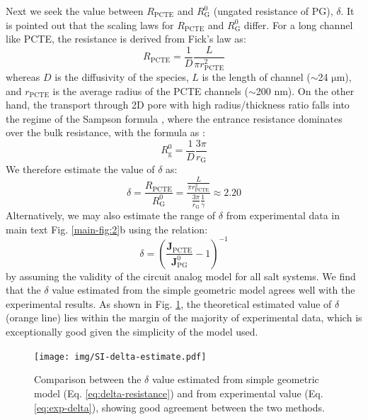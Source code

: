 \documentclass[manuscript=suppinfo,email=true, hyperref=true, keywords=false]{achemso}
\newcommand{\Fig}{Fig.}
\begin{document}
Next we seek the value between $R_{\mathrm{PCTE}}$ and
$R_{\mathrm{G}}^{0}$ (ungated resistance of PG), $\delta$. It is
pointed out that the scaling laws for $R_{\mathrm{PCTE}}$ and
$R_{\mathrm{G}}^{0}$ differ. For a long channel like PCTE, the
resistance is derived from Fick's law as\cite{O_Hern_2014}:
\begin{equation}
\label{eq:R-PCTE}
 R_{\mathrm{PCTE}} = \frac{1}{D} \frac{L}{\pi r_{\mathrm{PCTE}}^{2}}
\end{equation}
whereas $D$ is the diffusivity of the species, $L$ is the length of
channel ($\sim$24 $\mathrm{\mu}$m), and $r_{\mathrm{PCTE}}$ is the
average radius of the PCTE channels ($\sim$200 nm). On the other hand,
the transport through 2D pore with high radius/thickness ratio falls
into the regime of the Sampson formula \cite{Roscoe_1949}, where the
entrance resistance dominates over the bulk resistance, with the
formula as \cite{Roscoe_1949,Celebi_2014}:
\begin{equation}
  \label{eq:sampson}
  R_{\mathrm{g}}^{0} = \frac{1}{D} \frac{3 \pi}{r_{\mathrm{G}}}
\end{equation}
We therefore estimate the value of $\delta$ as:
\begin{equation}
  \label{eq:delta-resistance}
  \delta
  = \frac{R_{\mathrm{PCTE}}}{R_{\mathrm{G}}^{0}}
  = {\displaystyle
    \frac{{\displaystyle \frac{L}
        {\pi r_{\mathrm{PCTE}}^{2}}}}
    {{\displaystyle \frac{3 \pi}{r_{\mathrm{G}}} \frac{1}{\gamma}}}}
  \approx 2.20
\end{equation}
Alternatively, we may also estimate the range of $\delta$ from
experimental data in main text \Fig{} \ref{main-fig:2}b using the
relation:
\begin{equation}
  \label{eq:exp-delta}
  \delta = \left(\frac{\boldsymbol{J}_{\mathrm{PCTE}}}{\boldsymbol{J}_{\mathrm{PG}}^{0}} -1 \right)^{-1}
\end{equation}
by assuming the validity of the circuit analog model for all salt
systems. We find that the $\delta$ value estimated from the simple
geometric model agrees well with the experimental results. As shown in
\Fig{} \ref{fig:delta-compare}, the theoretical estimated value of $\delta$ (orange
line) lies within the margin of the majority of experimental data,
which is exceptionally good given the simplicity of the model used.

\begin{figure}[htbp]
  \centering
  \texttt{[image: img/SI-delta-estimate.pdf]}
  \caption{Comparison between the $\delta$ value estimated from simple
    geometric model (Eq. \ref{eq:delta-resistance}) and from
    experimental value (Eq. \ref{eq:exp-delta}), showing good
    agreement between the two methods.  }
  \label{fig:delta-compare}
\end{figure}
\end{document}
